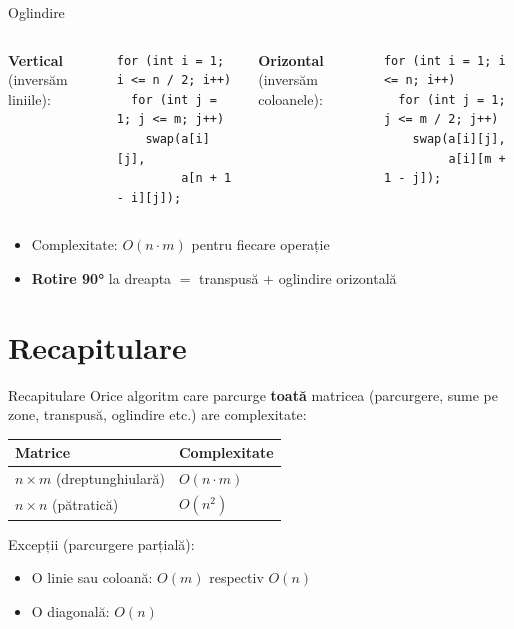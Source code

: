 ﻿\documentclass{beamer}
\begin{document}
\begin{frame}[fragile]{Oglindire}
  \begin{columns}[T]
    \textbf{Vertical} (inversăm liniile):
    \begin{lstlisting}
for (int i = 1; i <= n / 2; i++)
  for (int j = 1; j <= m; j++)
    swap(a[i][j],
         a[n + 1 - i][j]);
    \end{lstlisting}

    \textbf{Orizontal} (inversăm coloanele):
    \begin{lstlisting}
for (int i = 1; i <= n; i++)
  for (int j = 1; j <= m / 2; j++)
    swap(a[i][j],
         a[i][m + 1 - j]);
    \end{lstlisting}
  \end{columns}

  \smallskip
  \begin{itemize}
    \item Complexitate: $O(n \cdot m)$ pentru fiecare operație
    \item \textbf{Rotire 90°} la dreapta $=$ transpusă $+$ oglindire orizontală
  \end{itemize}
\end{frame}

\section{Recapitulare}

\begin{frame}{Recapitulare}
  Orice algoritm care parcurge \textbf{toată} matricea (parcurgere, sume pe zone, transpusă, oglindire etc.) are complexitate:

  \begin{center}
  \begin{tabular}{ll}
    \toprule
    Matrice & Complexitate \\
    \midrule
    $n \times m$ (dreptunghiulară) & $O(n \cdot m)$ \\
    $n \times n$ (pătratică)       & $O(n^2)$       \\
    \bottomrule
  \end{tabular}
  \end{center}

  \smallskip
  Excepții (parcurgere parțială):
  \begin{itemize}
    \item O linie sau coloană: $O(m)$ respectiv $O(n)$
    \item O diagonală: $O(n)$
  \end{itemize}
\end{frame}
\end{document}

